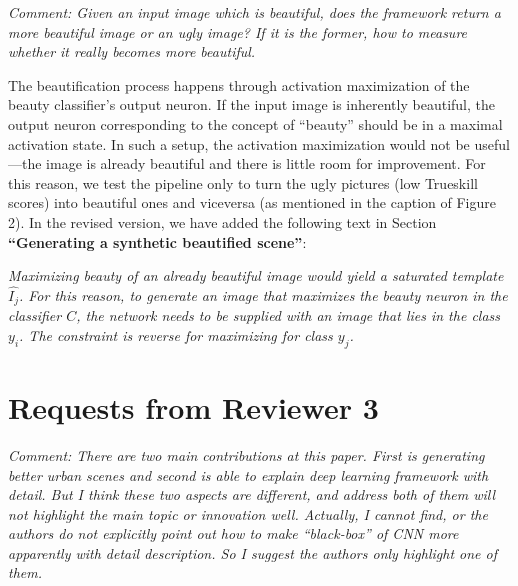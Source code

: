 \documentclass{paper}
\newenvironment{myquote}
{\definecolor{shadecolor}{rgb}{0.9,0.95,1} \begin{shaded*} \sf \em}
{\em\end{shaded*}}
\newenvironment{myquoteOrange}
{\definecolor{shadecolor}{rgb}{1,0.9,0.83} \begin{shaded*} \sf \em}
{\em\end{shaded*}}
\begin{document}
\begin{myquote}
\noindent Comment: Given an input image which is beautiful, does the framework return a more beautiful image or an ugly image? If it is the former, how to measure whether it really becomes more beautiful. 
\end{myquote}

\noindent The beautification process happens through activation maximization of the beauty classifier's output neuron. If the input image is inherently beautiful, the output neuron corresponding to the concept of ``beauty'' should be in a maximal activation state. In such a setup, the activation maximization would not be useful---the image is already beautiful and there is little room for improvement. For this reason, we test the pipeline only to turn the ugly pictures (low Trueskill scores) into beautiful ones and viceversa (as mentioned in the caption of Figure 2).
In the revised version, we have added the following text in Section \textbf{``Generating a synthetic beautified scene''}:

\begin{myquoteOrange}
Maximizing beauty of an already beautiful image would yield a saturated template $\hat{I_j}$. For this reason, to generate an image that maximizes the beauty neuron in the classifier $C$, the network needs to be supplied with an image that lies in the class $y_i$. The constraint is reverse for maximizing for class $y_j$.
\end{myquoteOrange}


\section*{Requests from Reviewer 3}

\begin{myquote}
\noindent Comment: There are two main contributions at this paper. First is generating better urban scenes and second is able to explain deep learning framework with detail. But I think these two aspects are different, and address both of them will not highlight the main topic or innovation well. Actually, I cannot find, or the authors do not explicitly point out how to make ``black-box'' of CNN more apparently with detail description. So I suggest the authors only highlight one of them.
\end{myquote}
\end{document}

